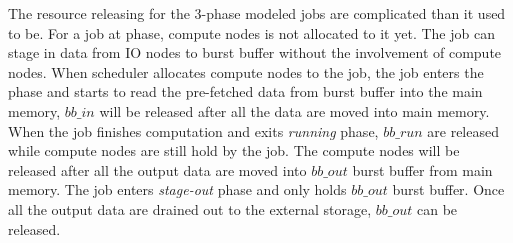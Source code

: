 

The resource releasing for the 3-phase modeled jobs are complicated than it used to be. 
For a job at  phase, compute nodes is not allocated to it yet. 
The job can stage in data from IO nodes to burst buffer without the involvement of compute nodes.
When scheduler allocates compute nodes to the job, the job enters the  phase 
and starts to read the pre-fetched data from burst buffer into the main memory, 
$bb\_in$ will be released after all the data are moved into main memory. 
When the job finishes computation and exits \textit{running} phase, 
$bb\_run$ are released while compute nodes are still hold by the job. 
The compute nodes will be released after all the output data are moved into $bb\_out$ burst buffer from main memory.
The job enters \textit{stage-out} phase and only holds $bb\_out$ burst buffer. 
Once all the output data are drained out to the external storage,  
$bb\_out$ can be released. 
